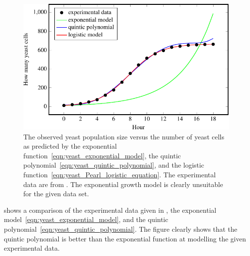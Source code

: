 \documentclass[a4paper,oneside,12pt]{article}
\begin{document}
\begin{problem}
{\begin{solution}
\begin{figure}[!htbp]
\centering
\includegraphics[scale=1.1]{image/11/yeast.pdf}
\caption{%
  The observed yeast population size versus the number of yeast cells
  as predicted by the exponential
  function~\eqref{eqn:yeast_exponential_model}, the quintic
  polynomial~\eqref{eqn:yeast_quintic_polynomial}, and the logistic
  function~\eqref{eqn:yeast_Pearl_logistic_equation}.  The
  experimental data are from .  The exponential
  growth model is clearly unsuitable for the given data set.
}
\label{fig:yeast_data_versus_models}
\end{figure}

 shows a comparison of the
experimental data given in , the exponential
model~\eqref{eqn:yeast_exponential_model}, and the quintic
polynomial~\eqref{eqn:yeast_quintic_polynomial}.  The figure clearly
shows that the quintic polynomial is better than the exponential
function at modelling the given experimental data.

\begin{table}[!htbp]
\centering

\caption{%
  A comparison of three models of the data in .  The
  first is the exponential
  function~\eqref{eqn:yeast_exponential_model}, the second is the
  quintic polynomial~\eqref{eqn:yeast_quintic_polynomial}, and the
  third is the logistic
  function~\eqref{eqn:yeast_Pearl_logistic_equation}.  The predictions
  of these models have been rounded to one decimal place.  Also shown
  are the squared errors of each model.  These errors have been
  rounded to three decimal places.  Note that most numbers have been
  rounded so as to fit the table.  However, you should avoid rounding
  any intermediate results.
}
\label{tab:yeast_compare_models}
\end{table}


\end{solution}}
\end{problem}
\end{document}
